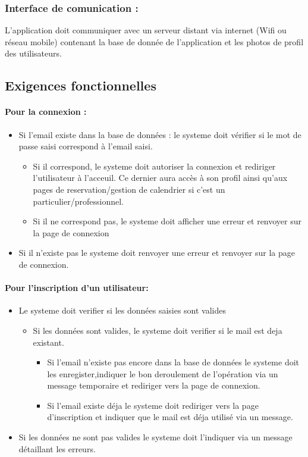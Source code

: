 \documentclass{article}
\begin{document}
\subsubsection{Interface de comunication :}
L'application doit communiquer avec un serveur distant via internet
(Wifi ou réseau mobile) contenant la base de donnée de l'application et
les photos de profil des utilisateurs.


\subsection{Exigences fonctionnelles}
\paragraph{Pour la connexion : }

\begin{itemize}
\item Si l'email existe dans la base de données :
	le systeme doit vérifier si le mot de passe saisi
	correspond à l'email saisi.
		\begin{itemize}
		\item Si il correspond, le systeme doit autoriser la connexion et
			rediriger l'utilisateur à l'acceuil. Ce dernier aura accès à son
			profil ainsi qu'aux pages de reservation/gestion de calendrier
			si c'est un particulier/professionnel.
		\item Si il ne correspond pas, le systeme doit afficher une erreur
			et renvoyer sur la page de connexion
		\end{itemize}
\item Si il n'existe pas le systeme doit renvoyer une erreur
	et renvoyer sur la page de connexion.
\end{itemize}


\paragraph{Pour l'inscription d'un utilisateur: }
\begin{itemize}
\item Le systeme doit verifier si les données saisies sont valides
	\begin{itemize}
	\item Si les données sont valides, le systeme doit verifier si le mail
		est deja existant.
		\begin{itemize}
		\item Si l'email n'existe pas encore dans la base de données le systeme
			doit les enregister,indiquer le bon deroulement de l'opération via un message temporaire et rediriger vers la page de connexion.
		\item Si l'email existe déja le systeme doit rediriger vers
			la page d'inscription et indiquer que le mail est déja utilisé
			via un message.
		\end{itemize}
	\end{itemize}
\item Si les données ne sont pas valides le systeme doit l'indiquer
	via un message détaillant les erreurs.
\end{itemize}
\end{document}
